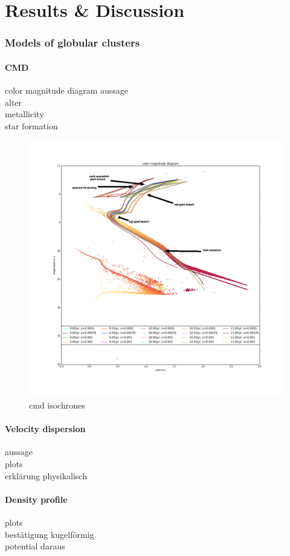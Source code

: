 \documentclass[a4paper,12pt,abstracton]{scrartcl}
\begin{document}
\part{Results \& Discussion}
\section{Models of globular clusters}
\subsection{CMD}
color magnitude diagram aussage\\
alter\\
metallicity\\
star formation\\
\begin{figure}[htbp] 
	\includegraphics[width=\textwidth]{./Plots/color_magnitude_diagram_with_iscochrones.png}
	\caption{cmd isochrones}
	\label{fig:Abbildung1} 
\end{figure}
\subsection{Velocity dispersion}
aussage\\
plots\\
erklärung physikalisch
\subsection{Density profile}
plots\\
bestätigung kugelförmig\\
potential daraus
\end{document}

